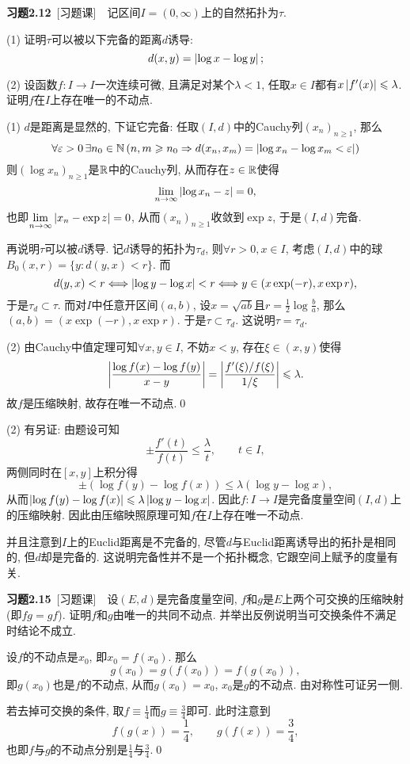 	\textbf{习题2.12}\ [习题课]\ \ 记区间$ I=(0,\infty) $上的自然拓扑为$ \tau $.
	
	(1) 证明$ \tau $可以被以下完备的距离$ d $诱导:
	\[
	d(x,y)=\left| \log x-\log y \right| ;
	\]
	
	(2) 设函数$ f : I\to I $一次连续可微, 且满足对某个$ \lambda<1 $, 任取$ x\in I $都有$ x\left| f'(x) \right| \leqslant\lambda $. 证明$ f $在$ I $上存在唯一的不动点.
	\begin{Proof}
	(1) $ d $是距离是显然的, 下证它完备: 任取$ (I,d) $中的Cauchy列$ (x_n)_{n\geqslant 1} $, 那么
	\[
	\forall\varepsilon>0\,\exists n_0\in\mathbb{N}\,(n,m\geqslant n_0\Rightarrow d(x_n,x_m)=\left| \log{x_n}-\log{x_m}<\varepsilon \right| )
	\]
	则$ (\log x_n)_{n\geqslant 1} $是$ \mathbb{R} $中的Cauchy列, 从而存在$ z\in\mathbb{R} $使得
	\[
	\lim_{n\to\infty}\left| \log x_n-z \right| =0,
	\]
	也即$ \lim\limits_{n\to\infty}\left| x_n-\exp z \right| =0 $, 从而$ (x_n)_{n\geqslant 1} $收敛到$ \exp z $, 于是$ (I,d) $完备.
	
	再说明$ \tau $可以被$ d $诱导. 记$ d $诱导的拓扑为$ \tau_d $, 则$ \forall r>0,x\in I $, 考虑$ (I,d) $中的球$ B_0(x,r)=\{ y : d(y,x)<r \} $. 而
	\[
	d(y,x)<r\Longleftrightarrow\left| \log y-\log x \right| <r\Longleftrightarrow y\in(x\exp (-r),x\exp r),
	\]
	于是$ \tau_d\subset \tau $. 而对$ I $中任意开区间$ (a,b) $, 设$ x=\sqrt{ab} $且$ r=\frac{1}{2}\log\frac{b}{a} $, 那么$ (a,b)=(x\exp(-r),x\exp r) $. 于是$ \tau\subset\tau_d $. 这说明$ \tau=\tau_d $.
	
	(2) 由Cauchy中值定理可知$ \forall x,y\in I $, 不妨$ x<y $, 存在$ \xi\in(x,y) $使得
	\[
	\left| \frac{\log f(x)-\log f(y)}{x-y} \right| =\left| \frac{f'(\xi)/f(\xi)}{1/\xi} \right| \leqslant\lambda.
	\]
	故$ f $是压缩映射, 故存在唯一不动点.\qed
	\end{Proof}
	\begin{Remark}
	(2) 有另证: 由题设可知
	\[
	\pm\frac{f'(t)}{f(t)}\leqslant\frac{\lambda}{t},\qquad t\in I,
	\]
	两侧同时在$ [x,y] $上积分得
	\[
	\pm(\log f(y)-\log f(x))\leqslant\lambda(\log y-\log x),
	\]
	从而$ \left| \log f(y)-\log f(x) \right| \leqslant\lambda\left| \log y-\log x \right|  $. 因此$ f : I\to I $是完备度量空间$ (I,d) $上的压缩映射. 因此由压缩映照原理可知$ f $在$ I $上存在唯一不动点.
	
	并且注意到$ I $上的Euclid距离是不完备的, 尽管$ d $与Euclid距离诱导出的拓扑是相同的, 但$ d $却是完备的. 这说明完备性并不是一个拓扑概念, 它跟空间上赋予的度量有关.
	\end{Remark}
	
	\textbf{习题2.15}\ [习题课]\ \ 设$ (E,d) $是完备度量空间, $ f $和$ g $是$ E $上两个可交换的压缩映射(即$ fg=gf $). 证明$ f $和$ g $由唯一的共同不动点. 并举出反例说明当可交换条件不满足时结论不成立.
	\begin{Proof}
	设$ f $的不动点是$ x_0 $, 即$ x_0=f(x_0) $. 那么
	\[
	g(x_0)=g(f(x_0))=f(g(x_0)),
	\]
	即$ g(x_0) $也是$ f $的不动点, 从而$ g(x_0)=x_0 $, $ x_0 $是$ g $的不动点. 由对称性可证另一侧.
	
	若去掉可交换的条件, 取$ f\equiv\frac{1}{4} $而$ g\equiv\frac{3}{4} $即可. 此时注意到
	\[
	f(g(x))=\frac{1}{4},\qquad g(f(x))=\frac{3}{4},
	\]
	也即$ f $与$ g $的不动点分别是$ \frac{1}{4} $与$ \frac{3}{4} $.\qed
	\end{Proof}
	
